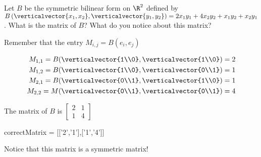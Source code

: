 \documentclass{ximera}
\begin{document}

\begin{question}
	Let $B$ be the symmetric bilinear form on $\R^2$ defined by $B\left(\verticalvector{x_1,x_2},\verticalvector{y_1,y_2}\right) = 2x_1y_1+4x_2y_2+x_1y_2+x_2y_1$.  What is the matrix of $B$?  What do you notice about this matrix?
	\begin{solution}
		\begin{hint}
			Remember that the entry $M_{i,j} = B(e_i,e_j)$
		\end{hint}
		\begin{hint}
			\begin{align*}
				M_{1,1} = B(\verticalvector{1\\0},\verticalvector{1\\0}) = 2\\
				M_{1,2} = B(\verticalvector{1\\0},\verticalvector{0\\1}) = 1\\
				M_{2,1} = B(\verticalvector{0\\1},\verticalvector{1\\0}) = 1\\
				M_{2,2} = M(\verticalvector{0\\1},\verticalvector{0\\1}) = 4
			\end{align*}
		\end{hint}
		\begin{hint}
			The matrix of $B$ is \(\begin{bmatrix} 2 & 1 \\ 1 & 4\end{bmatrix}\)
		\end{hint}
		\begin{matrix-answer}
			correctMatrix = [['2','1'],['1','4']]
		\end{matrix-answer}
	\end{solution}
	Notice that this matrix is a symmetric matrix!
\end{question}
\end{document}
